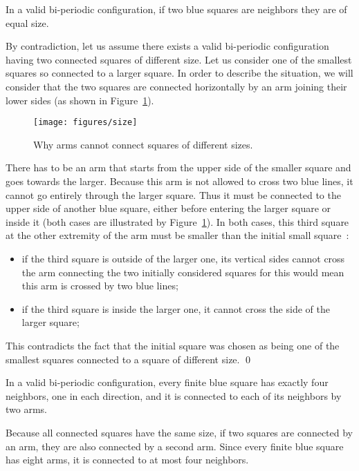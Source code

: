 \documentclass{jac}
\begin{document}
\begin{lemma}\label{lem:size}
    In a valid bi-periodic configuration, if two blue squares are neighbors they are of equal size.
\end{lemma}
\proof
By contradiction, let us assume there exists a valid bi-periodic configuration having two connected squares of different size. Let us consider one of the smallest squares so connected to a larger square. In order to describe the situation, we will consider that the two squares are connected horizontally by an arm joining their lower sides (as shown in Figure~\ref{fig:size}).

\begin{figure}[htbp]
    \centering
        \texttt{[image: figures/size]}
    \caption{Why arms cannot connect squares of different sizes.}
    \label{fig:size}
\end{figure}

There has to be an arm that starts from the upper side of the smaller square and goes towards the larger. Because this arm is not allowed to cross two blue lines, it cannot go entirely through the larger square. Thus it must be connected to the upper side of another blue square, either before entering the larger square or inside it (both cases are illustrated by Figure~\ref{fig:size}). In both cases, this third square at the other extremity of the arm must be smaller than the initial small square~:
\begin{itemize}
    \item if the third square is outside of the larger one, its vertical sides cannot cross the arm connecting the two initially considered squares for this would mean this arm is crossed by two blue lines;
    \item if the third square is inside the larger one, it cannot cross the side of the larger square;
\end{itemize}

This contradicts the fact that the initial square was chosen as being one of the smallest squares connected to a square of different size.
\qed

\begin{lemma}\label{lem:neighbors}
    In a valid bi-periodic configuration, every finite blue square has exactly four neighbors, one in each direction, and it is connected to each of its neighbors by two arms.
\end{lemma}
\proof Because all connected squares have the same size, if two squares are connected by an arm, they are also connected by a second arm. Since every finite blue square has eight arms, it is connected to at most four neighbors.
\end{document}
